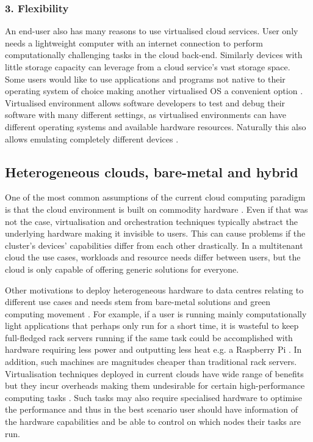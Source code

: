 \subsubsection*{3. Flexibility} 
 
An end-user also has many reasons to use virtualised cloud services. User only needs a lightweight computer with an internet connection to perform computationally challenging tasks in the cloud back-end. Similarly devices with little storage capacity can leverage from a cloud service's vast storage space. Some users would like to use applications and programs not native to their operating system of choice making another virtualised OS a convenient option \cite{ArpaciDusseau14-Book}. Virtualised environment allows software developers to test and debug their software with many different settings, as virtualised environments can have different operating systems and available hardware resources. Naturally this also allows emulating completely different devices \cite{eder2016hypervisor}.

\subsection{Heterogeneous clouds, bare-metal and hybrid}

One of the most common assumptions of the current cloud computing paradigm is that the cloud environment is built on commodity hardware \cite{Heterogeneous}. Even if that was not the case, virtualisation and orchestration techniques typically abstract the underlying hardware making it invisible to users. This can cause problems if the cluster's devices' capabilities differ from each other drastically. In a multitenant cloud the use cases, workloads and resource needs differ between users, but the cloud is only capable of offering generic solutions for everyone. 

Other motivations to deploy heterogeneous hardware to data centres relating to different use cases and needs stem from bare-metal solutions and green computing movement \cite{Kurp2008}. For example, if a user is running mainly computationally light applications that perhaps only run for a short time, it is wasteful to keep full-fledged rack servers running if the same task could be accomplished with hardware requiring less power and outputting less heat e.g. a Raspberry Pi \cite{raspberry}. In addition, such machines are magnitudes cheaper than traditional rack servers. Virtualisation techniques deployed in current clouds have wide range of benefits but they incur overheads making them undesirable for certain high-performance computing tasks \cite{virtualisation_overhead}. Such tasks may also require specialised hardware to optimise the performance and thus in the best scenario user should have information of the hardware capabilities and be able to control on which nodes their tasks are run.

